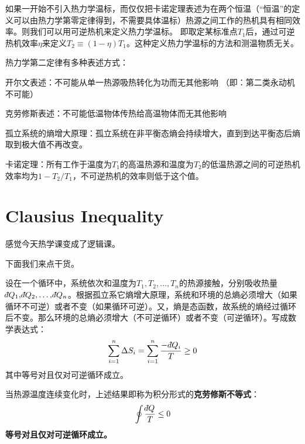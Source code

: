 \documentclass[CJK]{beamer}
\begin{document}
\begin{frame}
\bch
如果一开始不引入热力学温标，而仅仅把卡诺定理表述为在两个恒温（“恒温”的定义可以由热力学第零定律得到，不需要具体温标）热源之间工作的热机具有相同效率。则我们可以用可逆热机来定义热力学温标。
即取定某标准点$T_1$后，通过可逆热机效率$\eta$来定义$T_2 \equiv (1-\eta)T_1$。这种定义热力学温标的方法和测温物质无关。
\ech
\end{frame}

\begin{frame}
\bch
热力学第二定律有多种表述方式：
\bitem
\item{开尔文表述：不可能从单一热源吸热转化为功而无其他影响 （即：第二类永动机不可能）}
\item{克劳修斯表述：不可能低温物体传热给高温物体而无其他影响}
\item{孤立系统的熵增大原理：孤立系统在非平衡态熵会持续增大，直到到达平衡态后熵取到极大值不再改变。}
\item{卡诺定理：所有工作于温度为$T_1$的高温热源和温度为$T_2$的低温热源之间的可逆热机效率均为$1-T_2/T_1$，不可逆热机的效率则低于这个值。}
\eitem
\ech
\end{frame}

\section{Clausius Inequality}

\begin{frame}
\bch
\wulian 感觉今天热学课变成了逻辑课。

\skiplines

下面我们来点干货。
\ech
\end{frame}

\begin{frame}
\bch
设在一个循环中，系统依次和温度为$T_1, T_2, \ldots, T_n$的热源接触，分别吸收热量$\dbar Q_1, \dbar Q_2, \ldots, \dbar Q_n$。根据孤立系它熵增大原理，系统和环境的总熵必须增大（如果循环不可逆）或者不变（如果循环可逆）。又，熵是态函数，故系统的熵经过循环后不变。那么环境的总熵必须增大（不可逆循环）或者不变（可逆循环）。写成数学表达式：
$$\sum_{i=1}^n \Delta S_i = \sum_{i=1}^n \frac{-\,\dbar Q_i}{T} \ge 0$$
其中等号对且仅对可逆循环成立。

当热源温度连续变化时，上述结果即称为积分形式的{\bf 克劳修斯不等式}：
{\blue $$\oint \frac{\dbar Q}{T} \le 0 $$}
{\bf 等号对且仅对可逆循环成立。}

\ech
\end{frame}
\end{document}
